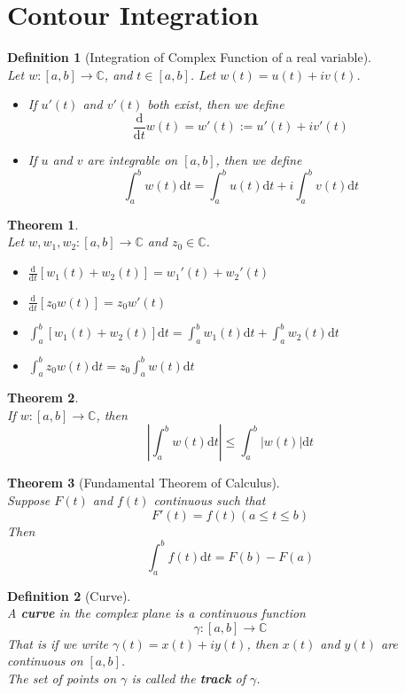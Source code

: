 \documentclass[12pt]{article}
\newcommand{\diff}{\mathrm{d}}
\newtheorem{definition}{Definition}[section]
\newtheorem{theorem}{Theorem}[section]
\theoremstyle{definition}
\begin{document}
\section{Contour Integration}
\begin{definition}[Integration of Complex Function of a real variable]
\hfill\\\normalfont Let $w:[a,b]\to \mathbb{C}$, and $t\in[a,b]$. Let $w(t)=u(t)+iv(t)$.\\
\begin{itemize}
	\item If $u'(t)$ and $v'(t)$ both exist, then we define
	\[
\frac{\diff }{\diff t}w(t) = w'(t):=u'(t)+iv'(t)
	\]
	\item If $u$ and $v$ are integrable on $[a,b]$, then we define
	\[
\int_a^b w(t)\diff t = \int_a^b u(t)\diff t + i\int_a^b v(t)\diff t
	\]
\end{itemize}
\end{definition}
\begin{theorem}
\hfill\\\normalfont Let $w,w_1,w_2:[a,b]\to\mathbb{C}$ and $z_0\in \mathbb{C}$.
\begin{itemize}
	\item $\frac{\diff }{\diff t}[w_1(t) + w_2(t)]=w_1'(t)+w_2'(t)$
	\item $\frac{\diff }{\diff t}[z_0w(t)]=z_0w'(t)$
	\item $\int_a^b[w_1(t)+w_2(t)]\diff t = \int_a^b w_1(t)\diff t + \int_a^b w_2(t)\diff t$
	\item $\int_a^b z_0w(t)\diff t = z_0\int_a^b w(t)\diff t$
\end{itemize}
\end{theorem}
\begin{theorem}\hfill\\\normalfont If $w:[a,b]\to \mathbb{C}$, then
\[
\left|\int_a^b w(t)\diff t\right|\leq \int_a^b|w(t)|\diff t
\]
\end{theorem}
\begin{theorem}[Fundamental Theorem of Calculus]
\hfill\\\normalfont Suppose $F(t)$ and $f(t)$ continuous such that 
\[
F'(t)=f(t) (a\leq t \leq b)
\]
Then
\[
\int_a^b f(t)\diff t = F(b)- F(a)
\]
\end{theorem}
\begin{definition}[Curve]
\hfill\\\normalfont A \textbf{curve} in the complex plane is a continuous function
\[
\gamma:[a,b]\to\mathbb{C}
\]
That is if we write $\gamma(t)=x(t)+iy(t)$, then $x(t)$ and $y(t)$ are continuous on $[a,b]$.\\
The set of points on $\gamma$ is called the \textbf{track} of $\gamma$.
\end{definition}
\end{document}
